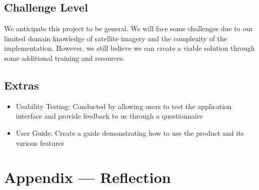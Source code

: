 \documentclass{article}
\begin{document}
\subsection{Challenge Level}
We anticipate this project to be general. We will face some challenges due to our limited domain knowledge of satellite imagery and the complexity of the implementation.
However, we still believe we can create a viable solution through some additional training and resources.

\subsection{Extras}
\begin{itemize}
  \item Usability Testing: Conducted by allowing users to test the application interface and provide feedback to us through a questionnaire
  \item User Guide: Create a guide demonstrating how to use the product and its various features
\end{itemize}


\newpage{}

\section*{Appendix --- Reflection}

\end{document}
